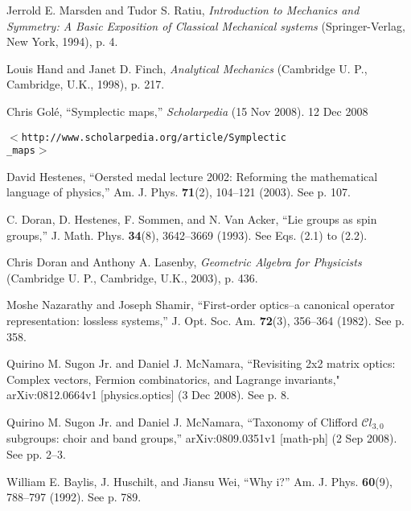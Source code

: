 \documentclass[11pt,twocolumn]{article}
\begin{document}
\begin{thebibliography}{99}
\footnotesize
{}
Jerrold E. Marsden and Tudor S. Ratiu, \textsl{Introduction to Mechanics and Symmetry: A Basic Exposition of Classical Mechanical systems} (Springer-Verlag, New York, 1994), p. 4.

Louis Hand and Janet D. Finch, \textsl{Analytical Mechanics} (Cambridge U. P., Cambridge, U.K., 1998), p. 217.

Chris Gol{\'e}, ``Symplectic maps,'' \textsl{Scholarpedia} (15 Nov 2008).  12 Dec 2008 

$<$\texttt{http://www.scholarpedia.org/article/Symplectic\\
\_maps}$>$

David Hestenes, ``Oersted medal lecture 2002: Reforming the mathematical language of physics,'' Am. J. Phys. \textbf{71}(2), 104--121 (2003).  See p. 107.

C. Doran, D. Hestenes, F. Sommen, and N. Van Acker, ``Lie groups as spin groups,'' J. Math. Phys. \textbf{34}(8), 3642--3669 (1993).  See Eqs. (2.1) to (2.2).

Chris Doran and Anthony A. Lasenby, \textsl{Geometric Algebra for Physicists} (Cambridge U. P., Cambridge, U.K., 2003), p. 436.

Moshe Nazarathy and Joseph Shamir, ``First-order optics--a canonical operator representation: lossless systems,'' J. Opt. Soc. Am. \textbf{72}(3), 356--364 (1982).  See p. 358.

Quirino M. Sugon Jr. and Daniel J. McNamara, ``Revisiting 2x2 matrix optics: Complex vectors, Fermion combinatorics, and Lagrange invariants," 	arXiv:0812.0664v1 [physics.optics] (3 Dec 2008).  See p. 8.

Quirino M. Sugon Jr. and Daniel J. McNamara, ``Taxonomy of Clifford $\mathcal Cl_{3,0}$ subgroups: choir and band groups,'' arXiv:0809.0351v1 [math-ph] (2 Sep 2008).  See pp. 2--3.

William E. Baylis, J. Huschilt, and Jiansu Wei, ``Why i?'' Am. J. Phys. \textbf{60}(9), 788--797 (1992).  See p. 789.


\end{thebibliography}
\end{document}
